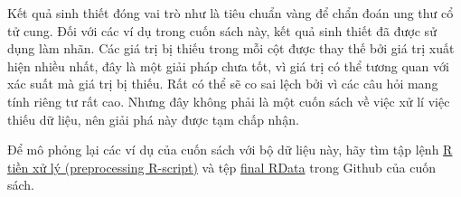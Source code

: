 Kết quả sinh thiết đóng vai trò như là tiêu chuẩn vàng để chẩn đoán ung thư cổ tử cung. Đối với các ví dụ trong cuốn sách này, kết quả sinh thiết đã được sử dụng làm nhãn. Các giá trị bị thiếu trong mỗi cột được thay thế bởi giá trị xuất hiện nhiều nhất, đây là một giải pháp chưa tốt, vì giá trị có thể tương quan với xác suất mà giá trị bị thiếu. Rất có thể sẽ co sai lệch bởi vì các câu hỏi mang tính riêng tư rất cao. Nhưng đây không phải là một cuốn sách về việc xử lí việc thiếu dữ liệu, nên giải phá  này được tạm chấp nhận.

Để mô phỏng lại các ví dụ của cuốn sách với bộ dữ liệu này, hãy tìm tập lệnh \href{https://github.com/christophM/interpretable-ml-book/blob/master/R/get-cervical-cancer-dataset.R}{R tiền xử lý (preprocessing R-script)}  và tệp \href{https://github.com/christophM/interpretable-ml-book/blob/master/data/cervical.RData}{final RData} trong Github của cuốn sách.


